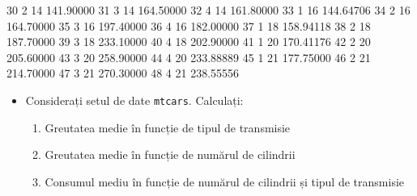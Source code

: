 \documentclass[]{article}
\newenvironment{Shaded}{\begin{snugshade}}{\end{snugshade}}
\newcommand{\DecValTok}[1]{\textcolor[rgb]{0.00,0.00,0.81}{#1}}
\newcommand{\FloatTok}[1]{\textcolor[rgb]{0.00,0.00,0.81}{#1}}
\newenvironment{frshaded*}{%
  \def\FrameCommand{\fboxrule=\FrameRule\fboxsep=\FrameSep \fcolorbox{framecolor}{shadecolor1}}%
  \MakeFramed {\advance\hsize-\width \FrameRestore}}%
{\endMakeFramed}
\newenvironment{rmdblock}[1]
  {\begin{frshaded*}
  \begin{itemize}
  \renewcommand{\labelitemi}{
    \raisebox{-.7\height}[0pt][0pt]{
      {\setkeys{Gin}{width=2em,keepaspectratio}\texttt{[image: images/icons/\#1]}}
    }
  }
  \item
  }
  {
  \end{itemize}
  \end{frshaded*}
  }
\newenvironment{rmdexercise}
  {\begin{rmdblock}{exercise}}
  {\end{rmdblock}}
\begin{document}
\begin{Shaded}
\begin{Highlighting}[]
\DecValTok{30}    \DecValTok{2}   \DecValTok{14} \FloatTok{141.90000}
\DecValTok{31}    \DecValTok{3}   \DecValTok{14} \FloatTok{164.50000}
\DecValTok{32}    \DecValTok{4}   \DecValTok{14} \FloatTok{161.80000}
\DecValTok{33}    \DecValTok{1}   \DecValTok{16} \FloatTok{144.64706}
\DecValTok{34}    \DecValTok{2}   \DecValTok{16} \FloatTok{164.70000}
\DecValTok{35}    \DecValTok{3}   \DecValTok{16} \FloatTok{197.40000}
\DecValTok{36}    \DecValTok{4}   \DecValTok{16} \FloatTok{182.00000}
\DecValTok{37}    \DecValTok{1}   \DecValTok{18} \FloatTok{158.94118}
\DecValTok{38}    \DecValTok{2}   \DecValTok{18} \FloatTok{187.70000}
\DecValTok{39}    \DecValTok{3}   \DecValTok{18} \FloatTok{233.10000}
\DecValTok{40}    \DecValTok{4}   \DecValTok{18} \FloatTok{202.90000}
\DecValTok{41}    \DecValTok{1}   \DecValTok{20} \FloatTok{170.41176}
\DecValTok{42}    \DecValTok{2}   \DecValTok{20} \FloatTok{205.60000}
\DecValTok{43}    \DecValTok{3}   \DecValTok{20} \FloatTok{258.90000}
\DecValTok{44}    \DecValTok{4}   \DecValTok{20} \FloatTok{233.88889}
\DecValTok{45}    \DecValTok{1}   \DecValTok{21} \FloatTok{177.75000}
\DecValTok{46}    \DecValTok{2}   \DecValTok{21} \FloatTok{214.70000}
\DecValTok{47}    \DecValTok{3}   \DecValTok{21} \FloatTok{270.30000}
\DecValTok{48}    \DecValTok{4}   \DecValTok{21} \FloatTok{238.55556}
\end{Highlighting}
\end{Shaded}

\begin{rmdexercise}
Considerați setul de date \texttt{mtcars}. Calculați:

\begin{enumerate}
\def\labelenumi{\alph{enumi})}
\item
  Greutatea medie în funcție de tipul de transmisie
\item
  Greutatea medie în funcție de numărul de cilindrii
\item
  Consumul mediu în funcție de numărul de cilindrii și tipul de
  transmisie
\end{enumerate}
\end{rmdexercise}


\end{document}
